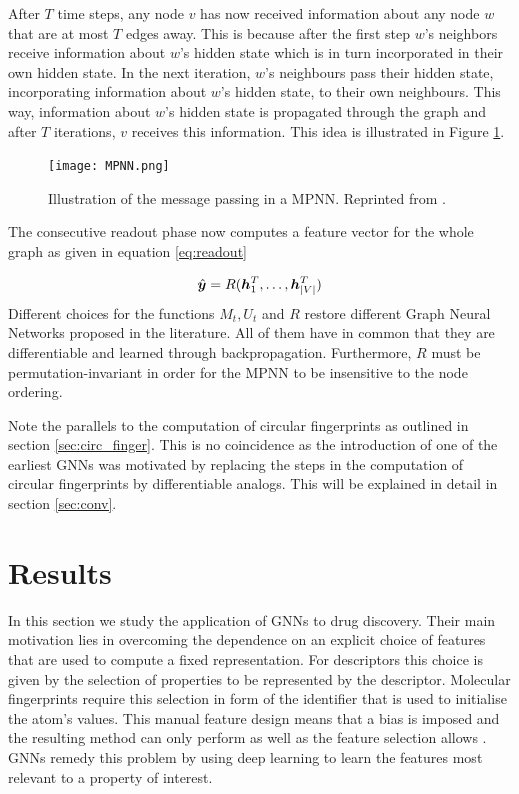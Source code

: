 After $T$ time steps, any node $v$ has now received information about any node $w$ that are at most $T$ edges away. This is because after the first step $w$'s neighbors receive information about $w$'s hidden state which is in turn incorporated in their own hidden state. In the next iteration, $w$'s neighbours pass their hidden state, incorporating information about $w$'s hidden state, to their own neighbours. This way, information about $w$'s hidden state is propagated through the graph and after $T$ iterations, $v$ receives this information. This idea is illustrated in Figure \ref{fig:mpnn}.
\begin{figure}[h]
	\centering 
	\texttt{[image: MPNN.png]}
	\caption{Illustration of the message passing in a MPNN. Reprinted from \cite{mpnn_graphics}. }
	\label{fig:mpnn}
\end{figure}
 
The consecutive readout phase now computes a feature vector for the whole graph as given in equation \ref{eq:readout}

\begin{equation}
\hat{\boldsymbol y} = R(\boldsymbol h_1^T, \ldots, \boldsymbol h_{|V|}^T) \label{eq:readout}
\end{equation}
Different choices for the functions $M_t, U_t$ and $R$ restore different Graph Neural Networks proposed in the literature. All of them have in common that they are differentiable and learned through backpropagation. Furthermore, $R$ must be permutation-invariant in order for the MPNN to be insensitive to the node ordering.

Note the parallels to the computation of circular fingerprints as outlined in section \ref{sec:circ_finger}. This is no coincidence as the introduction of one of the earliest GNNs \citep{duvenaud2015convolutional} was motivated by replacing the steps in the computation of circular fingerprints by differentiable analogs. This will be explained in detail in section \ref{sec:conv}.


\section{Results}
\label{sec:results}
In this section we study the application of GNNs to drug discovery. Their main motivation lies in overcoming the dependence on an explicit choice of features that are used to compute a fixed representation. For descriptors this choice is given by the selection of properties to be represented by the descriptor. Molecular fingerprints require this selection in form of the identifier that is used to initialise the atom's values. This manual feature design means that a bias is imposed and the resulting method can only perform as well as the feature selection allows \citep{merkwirth}. GNNs remedy this problem by using deep learning to learn the features most relevant to a property of interest.

